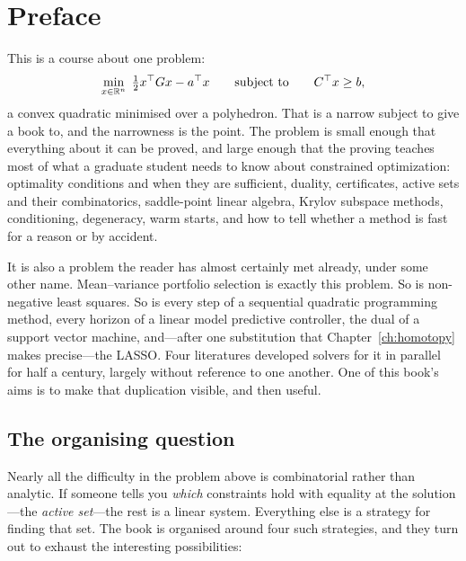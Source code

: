 \chapter*{Preface}

This is a course about one problem:
\[
  \min_{x \in \mathbb{R}^n} \; \tfrac12 x^{\top} G x - a^{\top} x
  \qquad\text{subject to}\qquad C^{\top} x \ge b,
\]
a convex quadratic minimised over a polyhedron. That is a narrow subject to
give a book to, and the narrowness is the point. The problem is small enough
that everything about it can be proved, and large enough that the proving
teaches most of what a graduate student needs to know about constrained
optimization: optimality conditions and when they are sufficient, duality,
certificates, active sets and their combinatorics, saddle-point linear algebra,
Krylov subspace methods, conditioning, degeneracy, warm starts, and how to tell
whether a method is fast for a reason or by accident.

It is also a problem the reader has almost certainly met already, under some
other name. Mean--variance portfolio selection is exactly this problem. So is
non-negative least squares. So is every step of a sequential quadratic
programming method, every horizon of a linear model predictive controller, the
dual of a support vector machine, and---after one substitution that
Chapter~\ref{ch:homotopy} makes precise---the LASSO. Four literatures developed
solvers for it in parallel for half a century, largely without reference to one
another. One of this book's aims is to make that duplication visible, and then
useful.

\section*{The organising question}

Nearly all the difficulty in the problem above is combinatorial rather than
analytic. If someone tells you \emph{which} constraints hold with equality at
the solution---the \emph{active set}---the rest is a linear system. Everything
else is a strategy for finding that set. The book is organised around four such
strategies, and they turn out to exhaust the interesting possibilities:

